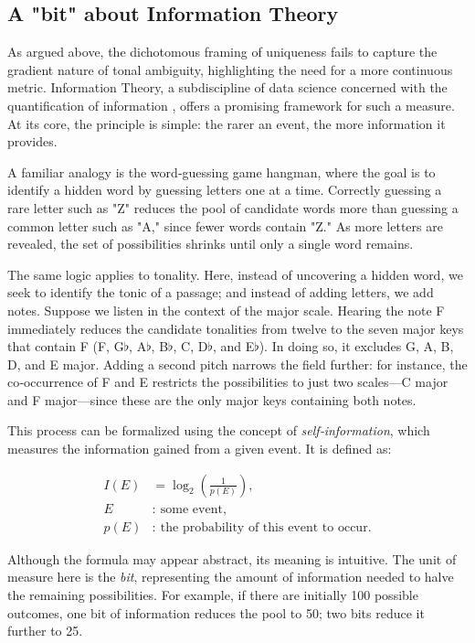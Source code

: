 \documentclass[10pt,twocolumn]{article}
\numberwithin{equation}{section} %
\begin{document}
    \subsection{A "bit" about Information Theory}

    As argued above, the dichotomous framing of uniqueness fails to capture the gradient nature of tonal ambiguity, highlighting the need for a more continuous metric.
    Information Theory, a subdiscipline of data science concerned with the quantification of information \citep{shannon1948}, offers a promising framework for such a measure.
    At its core, the principle is simple: the rarer an event, the more information it provides.

    A familiar analogy is the word‑guessing game hangman, where the goal is to identify a hidden word by guessing letters one at a time.
    Correctly guessing a rare letter such as "Z" reduces the pool of candidate words more than guessing a common letter such as "A," since fewer words contain "Z."
    As more letters are revealed, the set of possibilities shrinks until only a single word remains.

    The same logic applies to tonality.
    Here, instead of uncovering a hidden word, we seek to identify the tonic of a passage; and instead of adding letters, we add notes.
    Suppose we listen in the context of the major scale.
    Hearing the note F immediately reduces the candidate tonalities from twelve to the seven major keys that contain F (F, G$\flat$, A$\flat$, B$\flat$, C, D$\flat$, and E$\flat$).
    In doing so, it excludes G, A, B, D, and E major.
    Adding a second pitch narrows the field further: for instance, the co‑occurrence of F and E restricts the possibilities to just two scales—C major and F major—since these are the only major keys containing both notes.

    This process can be formalized using the concept of \textit{self}\textit{‑}\textit{information}, which measures the information gained from a given event.
    It is defined as:

    \begin{align}
        I(E) &= \log_{2} \left( \frac{1}{p(E)} \right), \\
        E &:\ \text{some event}, \\
        p(E) &:\ \text{the probability of this event to occur}.
    \end{align}


    Although the formula may appear abstract, its meaning is intuitive.
    The unit of measure here is the \textit{bit}, representing the amount of information needed to halve the remaining possibilities.
    For example, if there are initially 100 possible outcomes, one bit of information reduces the pool to 50; two bits reduce it further to 25.
\end{document}

